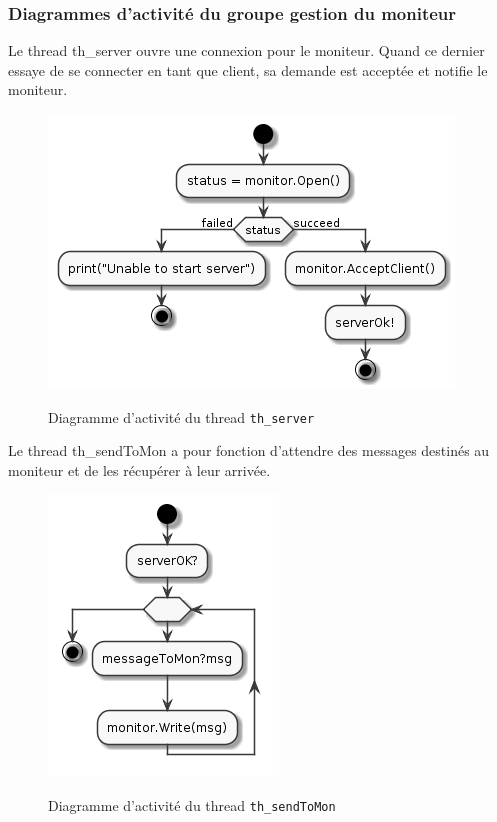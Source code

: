 \documentclass[11pt, a4paper]{paper}
\begin{document}
\subsubsection{Diagrammes d'activité  du groupe gestion du moniteur}

{Le thread th\_server ouvre une connexion pour le moniteur. Quand ce dernier essaye de se connecter en tant que client, sa demande est acceptée et notifie le moniteur. } 

\begin{figure}[htbp]
\label{fig:act_envoyer}
\begin{center}
{\includegraphics[scale=.3]{./figures-pdf/th_server}}
{\caption{Diagramme d'activité du thread {\tt th\_server}}}
\end{center}
\end{figure}
\FloatBarrier

{Le thread th\_sendToMon a pour fonction d'attendre des messages destinés au moniteur et de les récupérer à leur arrivée. }

\begin{figure}[htbp]
\label{fig:act_envoyer}
\begin{center}
{\includegraphics[scale=.3]{./figures-pdf/th_sendToMon}}
{\caption{Diagramme d'activité du thread {\tt th\_sendToMon}}}
\end{center}
\end{figure}
\FloatBarrier
\end{document}
